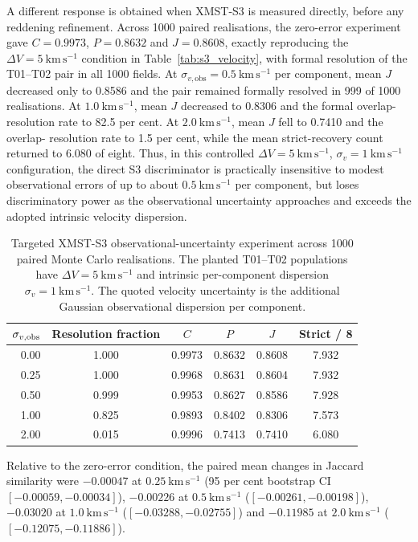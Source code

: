 \documentclass[fleqn,usenatbib]{rasti}
\begin{document}
A different response is obtained when XMST-S3 is measured directly,
before any reddening refinement. Across 1000 paired realisations, the
zero-error experiment gave $C=0.9973$, $P=0.8632$ and $J=0.8608$, exactly
reproducing the $\Delta V=5~\mathrm{km\,s^{-1}}$ condition in
Table~\ref{tab:s3_velocity}, with formal resolution of the T01--T02 pair in
all 1000 fields. At
$\sigma_{v,\mathrm{obs}}=0.5~\mathrm{km\,s^{-1}}$ per component,
mean $J$ decreased only to 0.8586 and the pair remained formally resolved
in 999 of 1000 realisations. At $1.0~\mathrm{km\,s^{-1}}$, mean $J$
decreased to 0.8306 and the formal overlap-resolution rate to 82.5 per cent.
At $2.0~\mathrm{km\,s^{-1}}$, mean $J$ fell to 0.7410 and the overlap-
resolution rate to 1.5 per cent, while the mean strict-recovery count
returned to 6.080 of eight. Thus, in this controlled
$\Delta V=5~\mathrm{km\,s^{-1}}$, $\sigma_v=1~\mathrm{km\,s^{-1}}$
configuration, the direct S3 discriminator is practically insensitive to
modest observational errors of up to about $0.5~\mathrm{km\,s^{-1}}$
per component, but loses discriminatory power as the observational
uncertainty approaches and exceeds the adopted intrinsic velocity
dispersion.

\begin{table}
\centering
\caption{Targeted XMST-S3 observational-uncertainty experiment across
1000 paired Monte Carlo realisations. The planted T01--T02 populations have
$\Delta V=5~\mathrm{km\,s^{-1}}$ and intrinsic per-component dispersion
$\sigma_v=1~\mathrm{km\,s^{-1}}$. The quoted velocity uncertainty is the
additional Gaussian observational dispersion per component.}
\label{tab:s3_uncertainty}
\begin{tabular}{rccccc}
\hline
$\sigma_{v,\rm obs}$ & Resolution fraction & $C$ & $P$ & $J$ & Strict / 8 \\
\hline
0.00 & 1.000 & 0.9973 & 0.8632 & 0.8608 & 7.932 \\
0.25 & 1.000 & 0.9968 & 0.8631 & 0.8604 & 7.932 \\
0.50 & 0.999 & 0.9953 & 0.8627 & 0.8586 & 7.928 \\
1.00 & 0.825 & 0.9893 & 0.8402 & 0.8306 & 7.573 \\
2.00 & 0.015 & 0.9996 & 0.7413 & 0.7410 & 6.080 \\
\hline
\end{tabular}
\end{table}

Relative to the zero-error condition, the paired mean changes in Jaccard
similarity were $-0.00047$ at
$0.25~\mathrm{km\,s^{-1}}$ (95 per cent bootstrap CI
$[-0.00059,-0.00034]$), $-0.00226$ at
$0.5~\mathrm{km\,s^{-1}}$ ($[-0.00261,-0.00198]$), $-0.03020$ at
$1.0~\mathrm{km\,s^{-1}}$ ($[-0.03288,-0.02755]$) and $-0.11985$ at
$2.0~\mathrm{km\,s^{-1}}$ ($[-0.12075,-0.11886]$).
\end{document}
